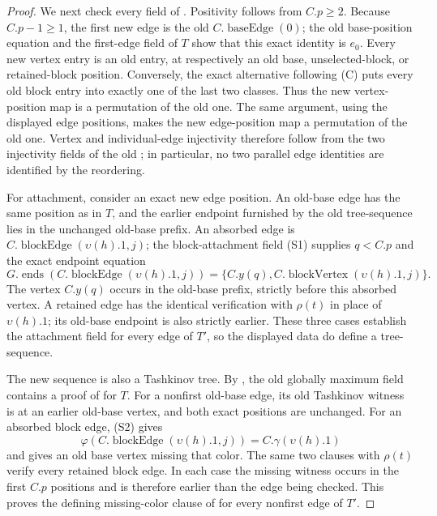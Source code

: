 \begin{proof}
We next check every field of .  Positivity follows
from $C.p\ge2$.  Because $C.p-1\ge1$, the first new edge is the old
$C.\operatorname{baseEdge}(0)$; the old base-position equation and the
first-edge field of $T$ show that this exact identity is $e_0$.  Every new
vertex entry is an old entry, at respectively an old base, unselected-block,
or retained-block position.  Conversely, the exact alternative following
(C) puts every old block entry into exactly one of the last two classes.
Thus the new vertex-position map is a permutation of the old one.  The same
argument, using the displayed edge positions, makes the new edge-position
map a permutation of the old one.  Vertex and individual-edge injectivity
therefore follow from the two injectivity fields of the old
; in particular, no two parallel edge identities are
identified by the reordering.

For attachment, consider an exact new edge position.  An old-base edge has
the same position as in $T$, and the earlier endpoint furnished by the old
tree-sequence lies in the unchanged old-base prefix.  An absorbed edge is
$C.\operatorname{blockEdge}(\upsilon(h).1,j)$; the block-attachment field
(S1) supplies $q<C.p$ and the exact endpoint equation
\[
 G.\operatorname{ends}
   (C.\operatorname{blockEdge}(\upsilon(h).1,j))
 =\{C.y(q),C.\operatorname{blockVertex}(\upsilon(h).1,j)\}.
\]
The vertex $C.y(q)$ occurs in the old-base prefix, strictly before this
absorbed vertex.  A retained edge has the identical verification with
$\rho(t)$ in place of $\upsilon(h).1$; its old-base endpoint is also
strictly earlier.  These three cases establish the attachment field for
every edge of $T'$, so the displayed data do define a tree-sequence.

The new sequence is also a Tashkinov tree.  By
, the old globally maximum field contains a
proof of  for $T$.  For a nonfirst old-base edge,
its old Tashkinov witness is at an earlier old-base vertex, and both exact
positions are unchanged.  For an absorbed block edge, (S2) gives
\[
 \varphi(C.\operatorname{blockEdge}(\upsilon(h).1,j))
   =C.\gamma(\upsilon(h).1)
\]
and gives an old base vertex missing that color.  The same two clauses with
$\rho(t)$ verify every retained block edge.  In each case the missing
witness occurs in the first $C.p$ positions and is therefore earlier than
the edge being checked.  This proves the defining missing-color clause of
 for every nonfirst edge of $T'$.


\end{proof}
